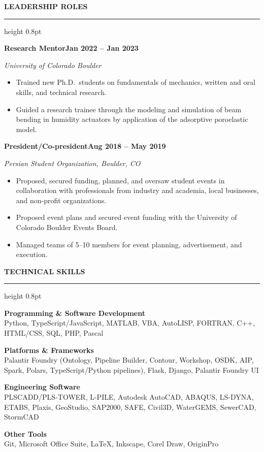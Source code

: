 \documentclass[10pt, letterpaper]{article}
\newcommand{\rsection}[1]{%
  \vspace{10pt}%
  {\large\bfseries\MakeUppercase{#1}}%
  \vspace{1pt}%
  \hrule height 0.8pt%
  \vspace{5pt}%
}
\newcommand{\jobline}[2]{%
  \vspace{5pt}%
  \noindent\textbf{#1}\hfill\textbf{#2}\par%
  \vspace{1pt}%
}
\newcommand{\subline}[1]{%
  \vspace{-1pt}%
  \noindent\textit{#1}\par%
  \vspace{1pt}%
}
\newenvironment{rlist}{%
  \begin{itemize}[leftmargin=1.4em, itemsep=1pt, topsep=2pt, parsep=0pt]%
}{%
  \end{itemize}%
}
\begin{document}
\rsection{Leadership Roles}

\jobline{Research Mentor}{Jan 2022 -- Jan 2023}
\subline{University of Colorado Boulder}
\begin{rlist}
  \item Trained new Ph.D.\ students on fundamentals of mechanics, written and oral skills, and technical research.
  \item Guided a research trainee through the modeling and simulation of beam bending in humidity actuators by application of the adsorptive poroelastic model.
\end{rlist}

\jobline{President/Co-president}{Aug 2018 -- May 2019}
\subline{Persian Student Organization, Boulder, CO}
\begin{rlist}
  \item Proposed, secured funding, planned, and oversaw student events in collaboration with professionals from industry and academia, local businesses, and non-profit organizations.
  \item Proposed event plans and secured event funding with the University of Colorado Boulder Events Board.
  \item Managed teams of 5--10 members for event planning, advertisement, and execution.
\end{rlist}

\rsection{Technical Skills}

\vspace{4pt}
\noindent\textbf{Programming \& Software Development}\\
Python, TypeScript/JavaScript, MATLAB, VBA, AutoLISP, FORTRAN, C++, HTML/CSS, SQL, PHP, Pascal

\vspace{4pt}
\noindent\textbf{Platforms \& Frameworks}\\
Palantir Foundry (Ontology, Pipeline Builder, Contour, Workshop, OSDK, AIP, Spark, Polars, TypeScript/Python pipelines), Flask, Django, Palantir Foundry UI

\vspace{4pt}
\noindent\textbf{Engineering Software}\\
PLSCADD/PLS-TOWER, L-PILE, Autodesk AutoCAD, ABAQUS, LS-DYNA, ETABS, Plaxis, GeoStudio, SAP2000, SAFE, Civil3D, WaterGEMS, SewerCAD, StormCAD

\vspace{4pt}
\noindent\textbf{Other Tools}\\
Git, Microsoft Office Suite, LaTeX, Inkscape, Corel Draw, OriginPro
\end{document}
